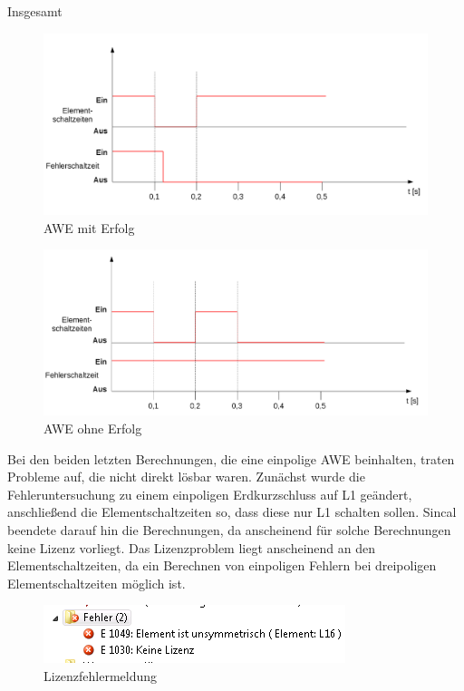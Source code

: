 \documentclass{scrartcl}
\begin{document}
\begin{onehalfspace}
Insgesamt

	\begin{figure}[H]
	\centering
	\includegraphics[scale=0.45]{img/awe-me.png}
	\caption{AWE mit Erfolg}
	\label{awe-me}
	\end{figure}

	\begin{figure}[H]
	\centering
	\includegraphics[scale=0.45]{img/awe-oe.png}
	\caption{AWE ohne Erfolg}
	\label{awe-oe}
	\end{figure}


Bei den beiden letzten Berechnungen, die eine einpolige AWE beinhalten, traten Probleme auf, die nicht direkt lösbar waren. Zunächst wurde die Fehleruntersuchung zu einem einpoligen Erdkurzschluss auf L1 geändert, anschließend die Elementschaltzeiten so, dass diese nur L1 schalten sollen. Sincal beendete darauf hin die Berechnungen, da anscheinend für solche Berechnungen keine Lizenz vorliegt. Das Lizenzproblem liegt anscheinend an den Elementschaltzeiten, da ein Berechnen von einpoligen Fehlern bei dreipoligen Elementschaltzeiten möglich ist.

	\begin{figure}[H]
	\centering
	\includegraphics[scale=1]{img/keine-lizenz.png}
	\caption{Lizenzfehlermeldung}
	\label{awe-oe}
	\end{figure}


\end{onehalfspace}
\end{document}
